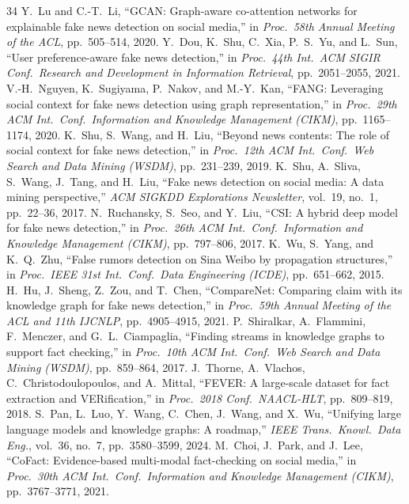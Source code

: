 \documentclass[10pt,twocolumn,a4paper]{article}
\begin{document}
{\begin{thebibliography}{34}
 Y.~Lu and C.-T.~Li, ``GCAN: Graph-aware co-attention networks for explainable fake news detection on social media,'' in \emph{Proc.\ 58th Annual Meeting of the ACL}, pp.~505--514, 2020.
 Y.~Dou, K.~Shu, C.~Xia, P.~S.~Yu, and L.~Sun, ``User preference-aware fake news detection,'' in \emph{Proc.\ 44th Int.\ ACM SIGIR Conf.\ Research and Development in Information Retrieval}, pp.~2051--2055, 2021.
 V.-H.~Nguyen, K.~Sugiyama, P.~Nakov, and M.-Y.~Kan, ``FANG: Leveraging social context for fake news detection using graph representation,'' in \emph{Proc.\ 29th ACM Int.\ Conf.\ Information and Knowledge Management (CIKM)}, pp.~1165--1174, 2020.
 K.~Shu, S.~Wang, and H.~Liu, ``Beyond news contents: The role of social context for fake news detection,'' in \emph{Proc.\ 12th ACM Int.\ Conf.\ Web Search and Data Mining (WSDM)}, pp.~231--239, 2019.
 K.~Shu, A.~Sliva, S.~Wang, J.~Tang, and H.~Liu, ``Fake news detection on social media: A data mining perspective,'' \emph{ACM SIGKDD Explorations Newsletter}, vol.~19, no.~1, pp.~22--36, 2017.
 N.~Ruchansky, S.~Seo, and Y.~Liu, ``CSI: A hybrid deep model for fake news detection,'' in \emph{Proc.\ 26th ACM Int.\ Conf.\ Information and Knowledge Management (CIKM)}, pp.~797--806, 2017.
 K.~Wu, S.~Yang, and K.~Q.~Zhu, ``False rumors detection on Sina Weibo by propagation structures,'' in \emph{Proc.\ IEEE 31st Int.\ Conf.\ Data Engineering (ICDE)}, pp.~651--662, 2015.
 H.~Hu, J.~Sheng, Z.~Zou, and T.~Chen, ``CompareNet: Comparing claim with its knowledge graph for fake news detection,'' in \emph{Proc.\ 59th Annual Meeting of the ACL and 11th IJCNLP}, pp.~4905--4915, 2021.
 P.~Shiralkar, A.~Flammini, F.~Menczer, and G.~L.~Ciampaglia, ``Finding streams in knowledge graphs to support fact checking,'' in \emph{Proc.\ 10th ACM Int.\ Conf.\ Web Search and Data Mining (WSDM)}, pp.~859--864, 2017.
 J.~Thorne, A.~Vlachos, C.~Christodoulopoulos, and A.~Mittal, ``FEVER: A large-scale dataset for fact extraction and VERification,'' in \emph{Proc.\ 2018 Conf.\ NAACL-HLT}, pp.~809--819, 2018.
 S.~Pan, L.~Luo, Y.~Wang, C.~Chen, J.~Wang, and X.~Wu, ``Unifying large language models and knowledge graphs: A roadmap,'' \emph{IEEE Trans.\ Knowl.\ Data Eng.}, vol.~36, no.~7, pp.~3580--3599, 2024.
 M.~Choi, J.~Park, and J.~Lee, ``CoFact: Evidence-based multi-modal fact-checking on social media,'' in \emph{Proc.\ 30th ACM Int.\ Conf.\ Information and Knowledge Management (CIKM)}, pp.~3767--3771, 2021.

\end{thebibliography}}
\end{document}
